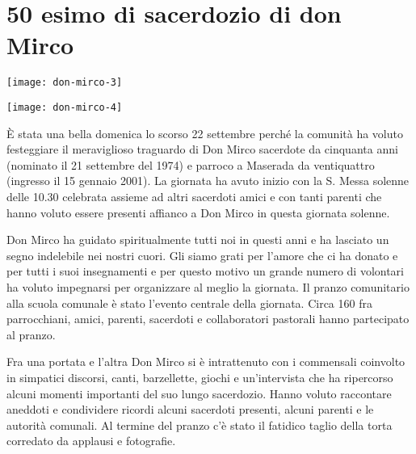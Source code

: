 \section{50 esimo di sacerdozio di don Mirco}

\begin{figure*}[!b]
\begin{minipage}{0.47\textwidth}
\texttt{[image: don-mirco-3]}
\end{minipage}
\hfill
\begin{minipage}{0.47\textwidth}
\texttt{[image: don-mirco-4]}
\end{minipage}
\end{figure*}

È stata una bella domenica lo scorso 22 settembre perché la comunità ha voluto festeggiare il meraviglioso traguardo di Don Mirco sacerdote da cinquanta anni
(nominato il 21 settembre del 1974) e parroco a Maserada da ventiquattro (ingresso il 15 gennaio 2001).
La giornata ha avuto inizio con la S. Messa solenne delle 10.30 celebrata assieme ad altri sacerdoti amici e con tanti parenti che hanno voluto essere presenti affianco a Don Mirco in questa giornata solenne.

Don Mirco ha guidato spiritualmente tutti noi in questi anni e ha lasciato un segno indelebile nei nostri cuori. Gli siamo grati per l'amore che ci ha donato e per tutti i suoi insegnamenti e per questo motivo un grande numero di volontari ha voluto impegnarsi per organizzare al meglio la giornata. Il pranzo comunitario alla scuola comunale è stato l'evento centrale della giornata. Circa 160 fra parrocchiani, amici, parenti, sacerdoti e collaboratori pastorali hanno partecipato al pranzo.


Fra una portata e l'altra Don Mirco si è intrattenuto con i commensali coinvolto in simpatici discorsi, canti, barzellette, giochi e un'intervista che ha ripercorso alcuni momenti importanti del suo lungo sacerdozio. Hanno voluto raccontare aneddoti e condividere ricordi alcuni sacerdoti presenti, alcuni parenti e le autorità comunali. Al termine del pranzo c'è stato il fatidico taglio della torta corredato da applausi e fotografie.



